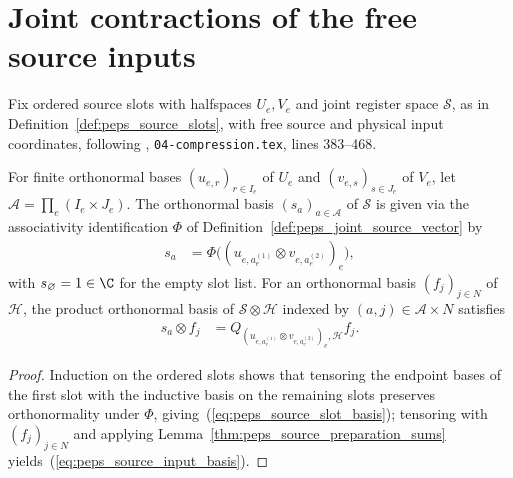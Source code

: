 \section{Joint contractions of the free source inputs}
\label{sec:peps_source_block_contraction}

Fix ordered source slots with halfspaces $U_e,V_e$ and joint register
space $\mathcal S$, as in Definition~\ref{def:peps_source_slots}, with free
source and physical input coordinates, following
\cite[proof of Theorem~5.2]{OpenAI2026PolynomialPEPS},
\texttt{04-compression.tex}, lines 383--468.


\begin{definition}
    \label{def:peps_source_slot_basis}
    For finite orthonormal bases $(u_{e,r})_{r\in I_e}$ of $U_e$ and
    $(v_{e,s})_{s\in J_e}$ of $V_e$, let $\mathcal A=\prod_e(I_e\times J_e)$.
    The orthonormal basis $(s_a)_{a\in\mathcal A}$ of $\mathcal S$ is given via
    the associativity identification $\Phi$ of
    Definition~\ref{def:peps_joint_source_vector} by
    \begin{align}
        s_a & =\Phi\bigl((u_{e,a_e^{(1)}}\otimes
        v_{e,a_e^{(2)}})_e\bigr),
        \label{eq:peps_source_slot_basis}
    \end{align}
    with $s_\varnothing=1\in\C$ for the empty slot list. For an orthonormal
    basis $(f_j)_{j\in N}$ of $\mathcal H$, the product orthonormal basis of
    $\mathcal S\otimes\mathcal H$ indexed by $(a,j)\in\mathcal A\times N$
    satisfies
    \begin{align}
        s_a\otimes f_j
         & =Q_{(u_{e,a_e^{(1)}}\otimes v_{e,a_e^{(2)}})_e,\mathcal H}f_j.
        \label{eq:peps_source_input_basis}
    \end{align}
\end{definition}

\begin{proof}
    Induction on the ordered slots shows that tensoring the endpoint bases of
    the first slot with the inductive basis on the remaining slots preserves
    orthonormality under $\Phi$, giving~(\ref{eq:peps_source_slot_basis});
    tensoring with $(f_j)_{j\in N}$ and applying
    Lemma~\ref{thm:peps_source_preparation_sums} yields~(\ref{eq:peps_source_input_basis}).
\end{proof}

